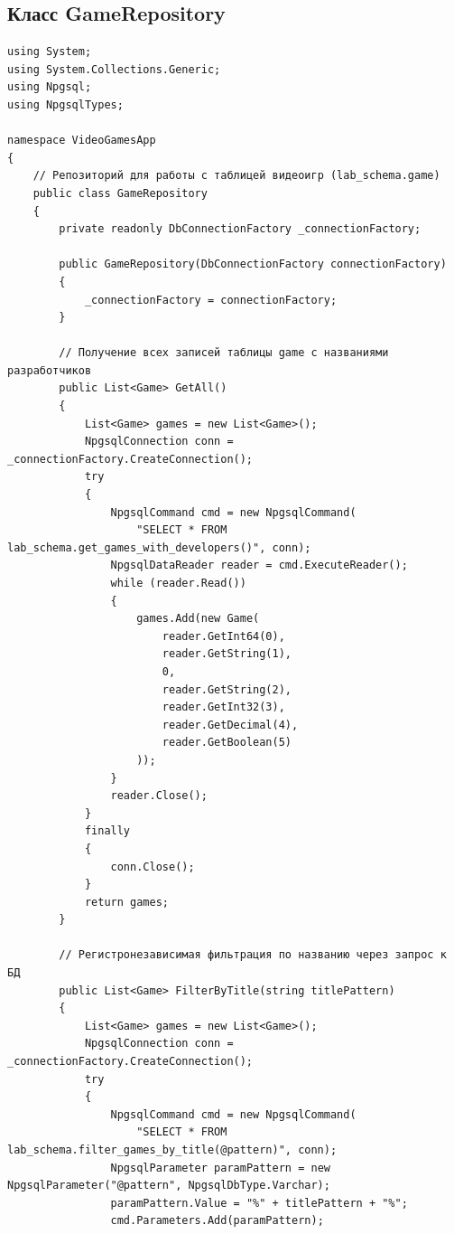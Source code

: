\documentclass[oneside,a4paper,14pt]{extarticle}
\begin{document}
	\subsection*{Класс GameRepository}
	\begin{lstlisting}[language={[Sharp]C}]
using System;
using System.Collections.Generic;
using Npgsql;
using NpgsqlTypes;

namespace VideoGamesApp
{
    // Репозиторий для работы с таблицей видеоигр (lab_schema.game)
    public class GameRepository
    {
        private readonly DbConnectionFactory _connectionFactory;

        public GameRepository(DbConnectionFactory connectionFactory)
        {
            _connectionFactory = connectionFactory;
        }

        // Получение всех записей таблицы game с названиями разработчиков
        public List<Game> GetAll()
        {
            List<Game> games = new List<Game>();
            NpgsqlConnection conn = _connectionFactory.CreateConnection();
            try
            {
                NpgsqlCommand cmd = new NpgsqlCommand(
                    "SELECT * FROM lab_schema.get_games_with_developers()", conn);
                NpgsqlDataReader reader = cmd.ExecuteReader();
                while (reader.Read())
                {
                    games.Add(new Game(
                        reader.GetInt64(0),
                        reader.GetString(1),
                        0,
                        reader.GetString(2),
                        reader.GetInt32(3),
                        reader.GetDecimal(4),
                        reader.GetBoolean(5)
                    ));
                }
                reader.Close();
            }
            finally
            {
                conn.Close();
            }
            return games;
        }

        // Регистронезависимая фильтрация по названию через запрос к БД
        public List<Game> FilterByTitle(string titlePattern)
        {
            List<Game> games = new List<Game>();
            NpgsqlConnection conn = _connectionFactory.CreateConnection();
            try
            {
                NpgsqlCommand cmd = new NpgsqlCommand(
                    "SELECT * FROM lab_schema.filter_games_by_title(@pattern)", conn);
                NpgsqlParameter paramPattern = new NpgsqlParameter("@pattern", NpgsqlDbType.Varchar);
                paramPattern.Value = "%" + titlePattern + "%";
                cmd.Parameters.Add(paramPattern);


\end{lstlisting}
\end{document}
